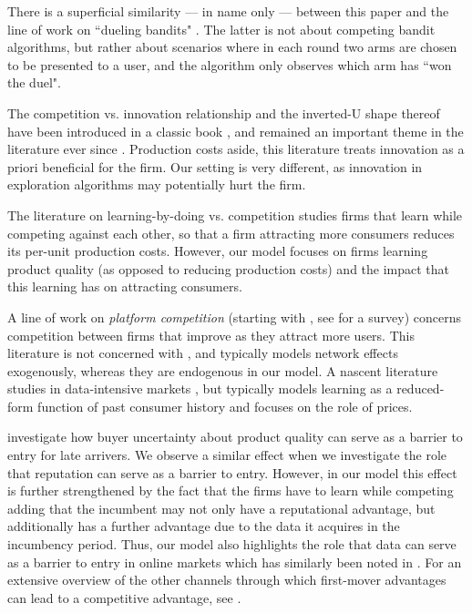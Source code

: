 There is a superficial similarity --- in name only --- between this paper and the line of work on ``dueling bandits"
    \citep[\eg][]{Yue-dueling12,Yue-dueling-icml09}.
The latter is not about competing bandit algorithms, but rather about scenarios where in each round two arms are chosen to be presented to a user, and the algorithm only observes which arm has ``won the duel".

 The competition vs. innovation relationship and the inverted-U shape thereof have been introduced in a classic book \citep{Schumpeter-42}, and remained an important theme in the literature ever since \cite[\eg][]{aghion2005competition,Vives-08}. Production costs aside, this literature treats innovation as a priori beneficial for the firm. Our setting is very different, as innovation in exploration algorithms may potentially hurt the firm.

The literature on learning-by-doing vs. competition \citep[\eg][]{fudenberg1983learning, dasgupta1988learning, cabral1994learning} studies firms that learn while competing against each other, so that a firm attracting more consumers reduces its per-unit production costs. However, our model focuses on firms learning product quality (as opposed to reducing production costs) and the impact that this learning has on attracting consumers.

A line of work on \emph{platform competition} (starting with \cite{Rysman09}, see \citet{Weyl-White-14} for a survey) concerns competition between firms that improve as they attract more users. This literature is not concerned with \innovation, and typically models network effects exogenously, whereas they are endogenous in our model.
A nascent literature studies 
in data-intensive markets \citep{prufer2017competing, hagiu2020data}, but typically models learning as a reduced-form function of past consumer history and focuses on the role of prices.

\cite{schmalensee1982product, bagwell1990informational} investigate how buyer uncertainty about product quality can serve as a barrier to entry for late arrivers. We observe a similar effect when we investigate the role that reputation can serve as a barrier to entry. 
However, in our model this effect is further strengthened by the fact that the firms have to learn while competing adding that the incumbent may not only have a reputational advantage, but additionally has a further advantage due to the data it acquires in the incumbency period. Thus, our model also highlights the role that data can serve as a barrier to entry in online markets which has similarly been noted in \cite{de2020data}. For an extensive overview of the other channels through which first-mover advantages can lead to a competitive advantage, see \cite{kerin1992first}.

